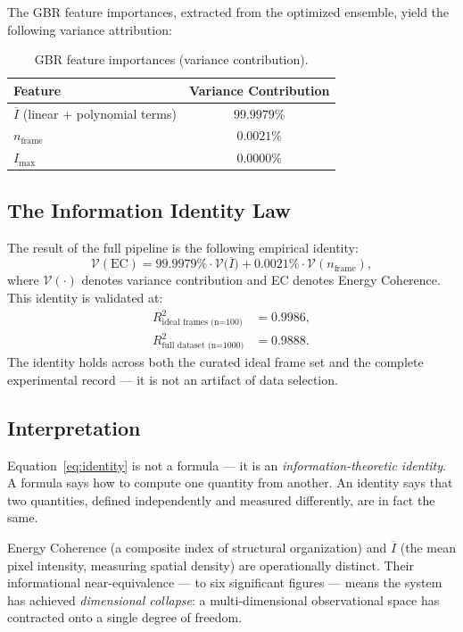 \documentclass[twocolumn,amsmath,amssymb,prl]{revtex4-2}
\begin{document}
The GBR feature importances, extracted from the optimized ensemble, yield
the following variance attribution:

\begin{table}[h]
\centering
\caption{GBR feature importances (variance contribution).}
\label{tab:importance}
\begin{tabular}{lc}
\toprule
Feature & Variance Contribution \\
\midrule
$\overline{I}$ (linear + polynomial terms) & $\mathbf{99.9979\%}$ \\
$n_{\text{frame}}$                          & $0.0021\%$ \\
$I_{\max}$                                  & $0.0000\%$ \\
\bottomrule
\end{tabular}
\end{table}

\subsection{The Information Identity Law}

The result of the full pipeline is the following empirical identity:
\begin{equation}
  \label{eq:identity}
  \boxed{
  \mathcal{V}(\text{EC})
    = 99.9979\% \cdot \mathcal{V}\!\bigl(\overline{I}\bigr)
    + 0.0021\% \cdot \mathcal{V}(n_{\text{frame}}),
  }
\end{equation}
where $\mathcal{V}(\cdot)$ denotes variance contribution and EC denotes
Energy Coherence.  This identity is validated at:
\begin{align}
  R^2_{\text{ideal frames (n=100)}} &= 0.9986, \\
  R^2_{\text{full dataset (n=1000)}} &= 0.9888.
\end{align}
The identity holds across both the curated ideal frame set and the complete
experimental record — it is not an artifact of data selection.

\subsection{Interpretation}

Equation~\eqref{eq:identity} is not a formula — it is an
\emph{information-theoretic identity}.  A formula says how to compute one
quantity from another.  An identity says that two quantities, defined
independently and measured differently, are in fact the same.

Energy Coherence (a composite index of structural organization) and
$\overline{I}$ (the mean pixel intensity, measuring spatial density) are
operationally distinct.  Their informational near-equivalence — to six
significant figures — means the system has achieved \emph{dimensional
collapse}: a multi-dimensional observational space has contracted onto a
single degree of freedom.
\end{document}
